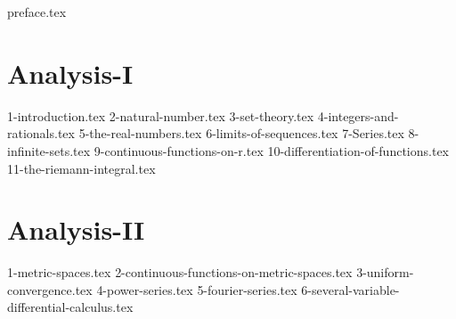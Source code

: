 \documentclass{myclass}
\begin{document}

\frontmatter

\maketitle

\tableofcontents

{preface.tex}


\mainmatter

\part{Analysis-I}

{1-introduction.tex}
{2-natural-number.tex}
{3-set-theory.tex}
{4-integers-and-rationals.tex}
{5-the-real-numbers.tex}
{6-limits-of-sequences.tex}
{7-Series.tex}
{8-infinite-sets.tex}
{9-continuous-functions-on-r.tex}
{10-differentiation-of-functions.tex}
{11-the-riemann-integral.tex}

\part{Analysis-II}

{1-metric-spaces.tex}
{2-continuous-functions-on-metric-spaces.tex}
{3-uniform-convergence.tex}
{4-power-series.tex}
{5-fourier-series.tex}
{6-several-variable-differential-calculus.tex}


\backmatter

\printindex
\end{document}
